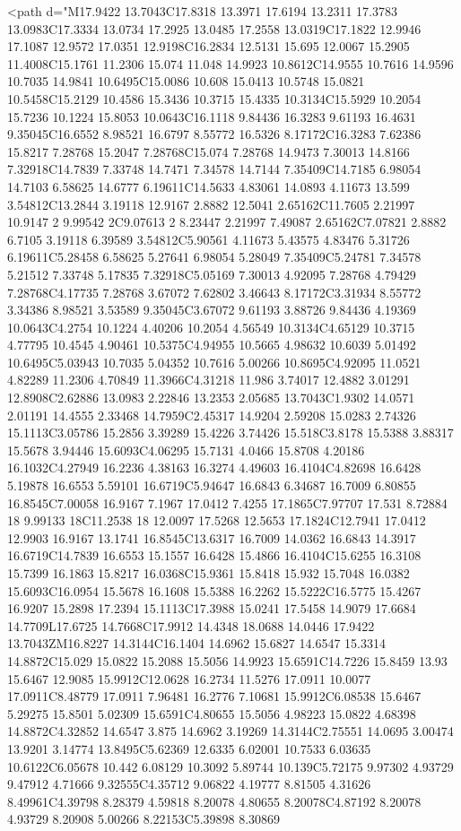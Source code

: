 {{{<path d="M17.9422 13.7043C17.8318 13.3971 17.6194 13.2311 17.3783 13.0983C17.3334 13.0734 17.2925 13.0485 17.2558 13.0319C17.1822 12.9946 17.1087 12.9572 17.0351 12.9198C16.2834 12.5131 15.695 12.0067 15.2905 11.4008C15.1761 11.2306 15.074 11.048 14.9923 10.8612C14.9555 10.7616 14.9596 10.7035 14.9841 10.6495C15.0086 10.608 15.0413 10.5748 15.0821 10.5458C15.2129 10.4586 15.3436 10.3715 15.4335 10.3134C15.5929 10.2054 15.7236 10.1224 15.8053 10.0643C16.1118 9.84436 16.3283 9.61193 16.4631 9.35045C16.6552 8.98521 16.6797 8.55772 16.5326 8.17172C16.3283 7.62386 15.8217 7.28768 15.2047 7.28768C15.074 7.28768 14.9473 7.30013 14.8166 7.32918C14.7839 7.33748 14.7471 7.34578 14.7144 7.35409C14.7185 6.98054 14.7103 6.58625 14.6777 6.19611C14.5633 4.83061 14.0893 4.11673 13.599 3.54812C13.2844 3.19118 12.9167 2.8882 12.5041 2.65162C11.7605 2.21997 10.9147 2 9.99542 2C9.07613 2 8.23447 2.21997 7.49087 2.65162C7.07821 2.8882 6.7105 3.19118 6.39589 3.54812C5.90561 4.11673 5.43575 4.83476 5.31726 6.19611C5.28458 6.58625 5.27641 6.98054 5.28049 7.35409C5.24781 7.34578 5.21512 7.33748 5.17835 7.32918C5.05169 7.30013 4.92095 7.28768 4.79429 7.28768C4.17735 7.28768 3.67072 7.62802 3.46643 8.17172C3.31934 8.55772 3.34386 8.98521 3.53589 9.35045C3.67072 9.61193 3.88726 9.84436 4.19369 10.0643C4.2754 10.1224 4.40206 10.2054 4.56549 10.3134C4.65129 10.3715 4.77795 10.4545 4.90461 10.5375C4.94955 10.5665 4.98632 10.6039 5.01492 10.6495C5.03943 10.7035 5.04352 10.7616 5.00266 10.8695C4.92095 11.0521 4.82289 11.2306 4.70849 11.3966C4.31218 11.986 3.74017 12.4882 3.01291 12.8908C2.62886 13.0983 2.22846 13.2353 2.05685 13.7043C1.9302 14.0571 2.01191 14.4555 2.33468 14.7959C2.45317 14.9204 2.59208 15.0283 2.74326 15.1113C3.05786 15.2856 3.39289 15.4226 3.74426 15.518C3.8178 15.5388 3.88317 15.5678 3.94446 15.6093C4.06295 15.7131 4.0466 15.8708 4.20186 16.1032C4.27949 16.2236 4.38163 16.3274 4.49603 16.4104C4.82698 16.6428 5.19878 16.6553 5.59101 16.6719C5.94647 16.6843 6.34687 16.7009 6.80855 16.8545C7.00058 16.9167 7.1967 17.0412 7.4255 17.1865C7.97707 17.531 8.72884 18 9.99133 18C11.2538 18 12.0097 17.5268 12.5653 17.1824C12.7941 17.0412 12.9903 16.9167 13.1741 16.8545C13.6317 16.7009 14.0362 16.6843 14.3917 16.6719C14.7839 16.6553 15.1557 16.6428 15.4866 16.4104C15.6255 16.3108 15.7399 16.1863 15.8217 16.0368C15.9361 15.8418 15.932 15.7048 16.0382 15.6093C16.0954 15.5678 16.1608 15.5388 16.2262 15.5222C16.5775 15.4267 16.9207 15.2898 17.2394 15.1113C17.3988 15.0241 17.5458 14.9079 17.6684 14.7709L17.6725 14.7668C17.9912 14.4348 18.0688 14.0446 17.9422 13.7043ZM16.8227 14.3144C16.1404 14.6962 15.6827 14.6547 15.3314 14.8872C15.029 15.0822 15.2088 15.5056 14.9923 15.6591C14.7226 15.8459 13.93 15.6467 12.9085 15.9912C12.0628 16.2734 11.5276 17.0911 10.0077 17.0911C8.48779 17.0911 7.96481 16.2776 7.10681 15.9912C6.08538 15.6467 5.29275 15.8501 5.02309 15.6591C4.80655 15.5056 4.98223 15.0822 4.68398 14.8872C4.32852 14.6547 3.875 14.6962 3.19269 14.3144C2.75551 14.0695 3.00474 13.9201 3.14774 13.8495C5.62369 12.6335 6.02001 10.7533 6.03635 10.6122C6.05678 10.442 6.08129 10.3092 5.89744 10.139C5.72175 9.97302 4.93729 9.47912 4.71666 9.32555C4.35712 9.06822 4.19777 8.81505 4.31626 8.49961C4.39798 8.28379 4.59818 8.20078 4.80655 8.20078C4.87192 8.20078 4.93729 8.20908 5.00266 8.22153C5.39898 8.30869 }}}
